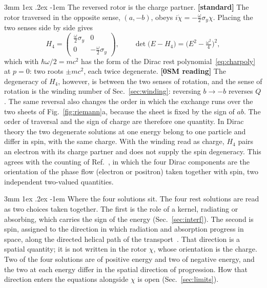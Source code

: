 \documentclass[%
 reprint, amsmath,amssymb, aps, prb, ]{revtex4-2}
\makeatletter
\numberwithin{equation}{section}
\renewcommand\paragraph{%
  \@startsection{paragraph}{4}{\z@}%
    {3mm \@plus 1ex \@minus .2ex}
    {-1em}
    {\normalfont\normalsize\itshape}}
\makeatother
\begin{document}
\paragraph{The reversed rotor is the charge partner.} \textbf{[standard]} The rotor traversed in the opposite sense, $(a,-b)$, obeys $i\dot\chi=-\tfrac{\omega}{2}\sigma_y\chi$. Placing the two senses side by side gives
\begin{equation}
H_4=\begin{pmatrix}\tfrac{\omega}{2}\sigma_y&0\\0&-\tfrac{\omega}{2}\sigma_y\end{pmatrix},\qquad
\det\!\big(E-H_4\big)=\Big(E^2-\tfrac{\omega^2}{4}\Big)^2 ,
\label{eq:H4}
\end{equation}
which with $\hbar\omega/2=mc^2$ has the form of the Dirac rest polynomial~\eqref{eq:charpoly} at $p=0$: two roots $\pm mc^2$, each twice degenerate. \textbf{[0SM reading]} The degeneracy of $H_4$, however, is between the two senses of rotation, and the sense of rotation is the winding number of Sec.~\ref{sec:winding}: reversing $b\to-b$ reverses $Q$. The same reversal also changes the order in which the exchange runs over the two sheets of Fig.~\ref{fig:riemann}a, because the sheet is fixed by the sign of $ab$. The order of traversal and the sign of charge are therefore one quantity. In Dirac theory the two degenerate solutions at one energy belong to one particle and differ in spin, with the same charge. With the winding read as charge, $H_4$ pairs an electron with its charge partner and does not supply the spin degeneracy. This agrees with the counting of Ref.~\cite{ref:p50}, in which the four Dirac components are the orientation of the phase flow (electron or positron) taken together with spin, two independent two-valued quantities.

\paragraph{Where the four solutions sit.} The four rest solutions are read as two choices taken together. The first is the role of a kernel, radiating or absorbing, which carries the sign of the energy (Sec.~\ref{sec:interf}). The second is spin, assigned to the direction in which radiation and absorption progress in space, along the directed helical path of the transport~\cite{ref:p51}. That direction is a spatial quantity; it is not written in the rotor $\chi$, whose orientation is the charge. Two of the four solutions are of positive energy and two of negative energy, and the two at each energy differ in the spatial direction of progression. How that direction enters the equations alongside $\chi$ is open (Sec.~\ref{sec:limits}).
\end{document}
